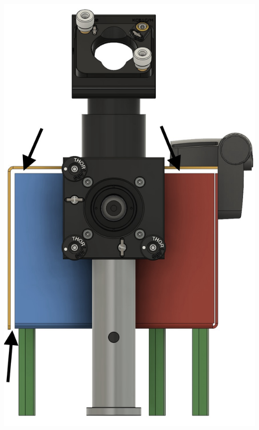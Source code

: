 \begin{minipage}[c]{0.38\textwidth}
    \begin{center}
        \includegraphics[width=\textwidth]{assets/figures/Protections_laser/Securite_mecanique/Protection_entree_laser/contrainte_passage_laser_capot.jpeg}
    \end{center}
    \label{contrainte_passage_laser_capot}
\end{minipage}

